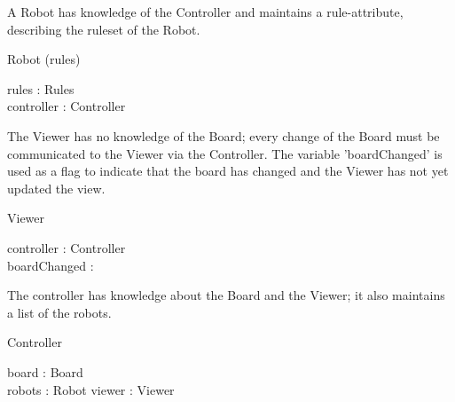 \documentclass[12pt]{article}
\begin{document}
A Robot has knowledge of the Controller and maintains a rule-attribute, describing the ruleset of the Robot.
\begin{class}{Robot}
\upharpoonright (rules) \\
\begin{state}
rules : Rules \\
controller : Controller
\end{state}
\end{class}

The Viewer has no knowledge of the Board; every change of the Board must be communicated to the Viewer via the Controller. The variable 'boardChanged' is used as a flag to indicate that the board has changed and the Viewer has not yet updated the view.
\begin{class}{Viewer}
\begin{state}
controller : Controller \\
boardChanged : \bool
\end{state}
\end{class}

The controller has knowledge about the Board and the Viewer; it also maintains a list of the robots.
\begin{class}{Controller}
\begin{state}
board : Board \\
robots : \power Robot
viewer : Viewer
\end{state}
\end{class}
\end{document}
